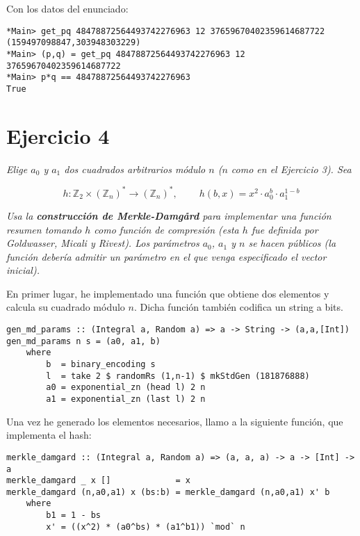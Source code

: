 \documentclass[10pt,spanish]{article}
\begin{document}
Con los datos del enunciado:

\begin{verbatim}
*Main> get_pq 48478872564493742276963 12 37659670402359614687722
(159497098847,303948303229)
*Main> (p,q) = get_pq 48478872564493742276963 12 37659670402359614687722
*Main> p*q == 48478872564493742276963
True
\end{verbatim}

\section{\textcolor{azul}Ejercicio 4}
\textit{Elige $a_0$ y $a_1$ dos cuadrados arbitrarios módulo $n$ ($n$ como en el Ejercicio 3). Sea}

\begin{displaymath}
    h: \mathbb{Z}_2 \times (\mathbb{Z}_n)^* \rightarrow (\mathbb{Z}_n)^*, \qquad\ h(b,x) = x^2 \cdot a_0^b \cdot a_1^{1-b}
\end{displaymath}

\textit{Usa la \textbf{\textcolor{azul}{construcción de Merkle-Damgård}} para implementar una función resumen tomando $h$ como función de compresión (esta $h$ fue definida por Goldwasser, Micali y Rivest). Los parámetros $a_0$, $a_1$ y $n$ se hacen públicos (la función debería admitir un parámetro en el que venga especificado el vector inicial).}

En primer lugar, he implementado una función que obtiene dos elementos y calcula su cuadrado módulo $n$. Dicha función también codifica un string a bits.

\begin{verbatim}
gen_md_params :: (Integral a, Random a) => a -> String -> (a,a,[Int])
gen_md_params n s = (a0, a1, b)
    where
        b  = binary_encoding s
        l  = take 2 $ randomRs (1,n-1) $ mkStdGen (181876888)
        a0 = exponential_zn (head l) 2 n
        a1 = exponential_zn (last l) 2 n
\end{verbatim}

Una vez he generado los elementos necesarios, llamo a la siguiente función, que implementa el hash:

\begin{verbatim}
merkle_damgard :: (Integral a, Random a) => (a, a, a) -> a -> [Int] -> a
merkle_damgard _ x []             = x
merkle_damgard (n,a0,a1) x (bs:b) = merkle_damgard (n,a0,a1) x' b
    where
        b1 = 1 - bs
        x' = ((x^2) * (a0^bs) * (a1^b1)) `mod` n
\end{verbatim}
\end{document}
